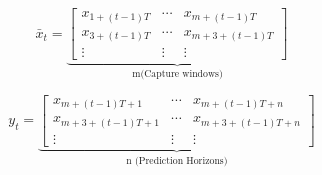 \documentclass{article}
\begin{document}
\begin{equation}
\bar{x}_t = 
\underbrace{\begin{bmatrix}
    x_{1+(t-1)T} & \cdots & x_{m+(t-1)T}\\
    x_{3+(t-1)T} & \cdots & x_{m+3+(t-1)T}\\
    \vdots & \vdots & \vdots 
\end{bmatrix}}_{\text{m(Capture windows)}}
\end{equation}

\begin{equation}
y_t = 
\underbrace{\begin{bmatrix}
    x_{m+(t-1)T + 1} & \cdots & x_{m+(t-1)T+ n}\\
    x_{m+3+(t-1)T + 1} & \cdots & x_{m+3+(t-1)T+ n}\\
    \vdots & \vdots & \vdots
\end{bmatrix}}_{\text{n (Prediction Horizons)}}
\end{equation}
\end{document}
